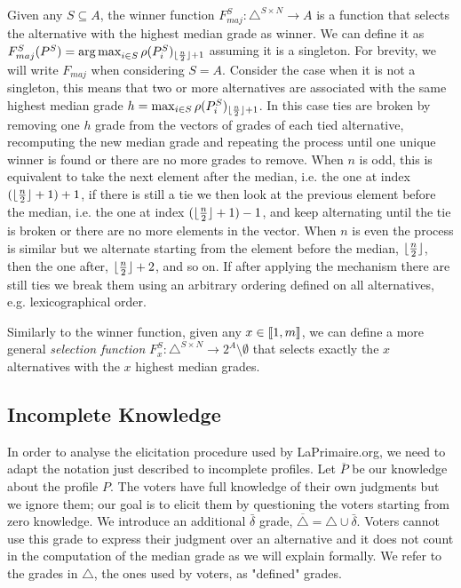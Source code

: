 \documentclass[version=3.21, pagesize, twoside=off, bibliography=totoc, DIV=calc, fontsize=12pt, a4paper]{scrartcl}
\begin{document}
Given any $S\subseteq A$, the winner function $F^S_{maj}:\triangle^{S \times N} \rightarrow A$ %
is a function that selects the alternative with the highest median grade as winner. We can define it as $F^S_{maj}(P^S) = \operatorname*{arg\,max}_{i\in S}\rho(P^S_i)_{\lfloor\frac{n}{2}\rfloor+ 1}$ assuming it is a singleton. For brevity, we will write $F_{maj}$ when considering $S=A$. Consider the case when it is not a singleton, this means that two or more alternatives are associated with the same highest median grade $h=\max_{i\in S}\rho(P^S_i)_{\lfloor\frac{n}{2}\rfloor + 1}$. In this case ties are broken by removing one $h$ grade from the vectors of grades of each tied alternative, recomputing the new median grade and repeating the process until one unique winner is found or there are no more grades to remove. When $n$ is odd, this is equivalent to take the next element after the median, i.e. the one at index $(\lfloor\frac{n}{2}\rfloor + 1) +1$, if there is still a tie we then look at the previous element before the median, i.e. the one at index $(\lfloor\frac{n}{2}\rfloor + 1) -1$, and keep alternating until the tie is broken or there are no more elements in the vector. When $n$ is even the process is similar but we alternate starting from the element before the median, $\lfloor\frac{n}{2}\rfloor$, then the one after, $\lfloor\frac{n}{2}\rfloor + 2$, and so on.  If after applying the mechanism there are still ties we break them using an arbitrary ordering defined on all alternatives, e.g. lexicographical order.

Similarly to the winner function, given any $x \in \llbracket1,m\rrbracket$, we can define a more general \emph{selection function} $F^S_x:\triangle^{S\times N} \rightarrow 2^A \setminus \emptyset$ that selects exactly the $x$ alternatives with the $x$ highest median grades.

\subsection{Incomplete Knowledge}
In order to analyse the elicitation procedure used by LaPrimaire.org, we need to adapt the notation just described to incomplete profiles. 
 Let $\overline{P}$ be our knowledge about the profile $P$.
The voters have full knowledge of their own judgments but we ignore them; our goal is to elicit them by questioning the voters starting from zero knowledge.
We introduce an additional $\bar{\delta}$ grade, $\overline{\triangle}=\triangle \cup \bar{\delta}$. Voters cannot use this grade to express their judgment over an alternative and it does not count in the computation of the median grade as we will explain formally. We refer to the grades in $\triangle$, the ones used by voters, as "defined" grades.
\end{document}

